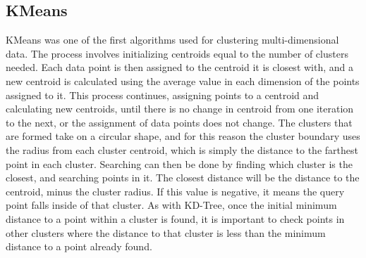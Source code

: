 \documentclass[journal]{IEEEtran}
\begin{document}
\subsection{KMeans}
KMeans was one of the first algorithms used for clustering multi-dimensional data. The process involves initializing centroids equal to the number of clusters needed. Each data point is then assigned to the centroid it is closest with, and a new centroid is calculated using the average value in each dimension of the points assigned to it. This process continues, assigning points to a centroid and calculating new centroids, until there is no change in centroid from one iteration to the next, or the assignment of data points does not change. The clusters that are formed take on a circular shape, and for this reason the cluster boundary uses the radius from each cluster centroid, which is simply the distance to the farthest point in each cluster. Searching can then be done by finding which cluster is the closest, and searching points in it. The closest distance will be the distance to the centroid, minus the cluster radius. If this value is negative, it means the query point falls inside of that cluster. As with KD-Tree, once the initial minimum distance to a point within a cluster is found, it is important to check points in other clusters where the distance to that cluster is less than the minimum distance to a point already found. \par
\end{document}
